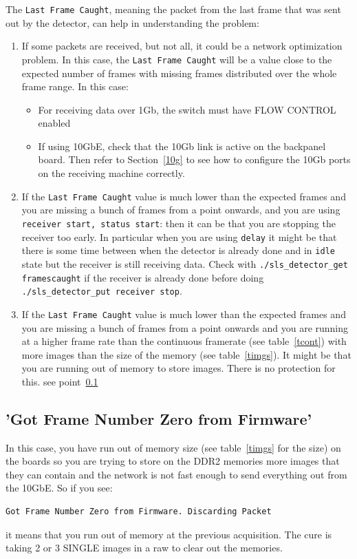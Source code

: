 \documentclass{article}
\begin{document}
The {\tt{Last Frame Caught}}, meaning the packet from the last frame that was sent out by the detector, can help in understanding the problem: 
\begin{enumerate}
\item If some packets are received, but not all, it could be a network optimization problem. In this case, the {\tt{Last Frame Caught}} will be a value close to the expected number of frames with missing frames distributed over the whole frame range. In this case: 
 \begin{itemize}
\item For receiving data over 1Gb, the switch must have FLOW CONTROL enabled 
\item If using 10GbE, check that the 10Gb link is active on the backpanel board. Then refer to Section~\ref{10g} to see how to configure the 10Gb ports on the receiving machine correctly. 
\end{itemize}
\item If the {\tt{Last Frame Caught}} value is much lower than the expected frames and you are missing a bunch of frames from a point onwards, and you are using {\tt{receiver start, status start}}: then it can be that you are stopping the receiver too early. In particular when you are using {\tt{delay}} it might be that there is some time between when the detector is already done and in {\tt{idle}} state but the receiver is still receiving data. Check with {\tt{./sls\_detector\_get framescaught}} if the receiver is already done before doing {\tt{./sls\_detector\_put receiver stop}}.   
\item If the {\tt{Last Frame Caught}} value is much lower than the expected frames and you are missing a bunch of frames from a point onwards and you are running at a higher frame rate than the continuous framerate (see table~\ref{tcont}) with more images than the size of the memory (see table~\ref{timgs}). It might be that you are running out of memory to store images. There is no protection for this. see point~\ref{outmemory}
 \end{enumerate}

\subsection{'Got Frame Number Zero from Firmware'}\label{outmemory}
In this case, you have run out of memory size (see table~\ref{timgs} for the size) on the boards so you are trying to store on the DDR2 memories more images that they can contain and the network is not fast enough to send everything out from the 10GbE.
So if you see:
\begin{verbatim}
Got Frame Number Zero from Firmware. Discarding Packet
\end{verbatim}
it means that you run out of memory at the previous acquisition. The  cure is taking 2 or 3 SINGLE images in a raw to clear out the memories.
 
\end{document}
